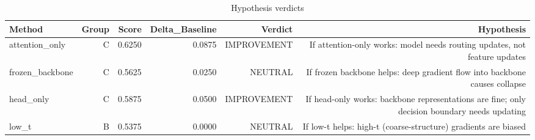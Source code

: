 \begin{table}[htbp]
\centering
\caption{Hypothesis verdicts}
\label{tab:hyp-verdicts}
\begin{tabular}{lrrrrr}
\toprule
\textbf{Method} & \textbf{Group} & \textbf{Score} & \textbf{Delta\_Baseline} & \textbf{Verdict} & \textbf{Hypothesis} \\
\midrule
attention\_only & C & 0.6250 & 0.0875 & IMPROVEMENT & If attention-only works: model needs routing updates, not feature updates \\
frozen\_backbone & C & 0.5625 & 0.0250 & NEUTRAL & If frozen backbone helps: deep gradient flow into backbone causes collapse \\
head\_only & C & 0.5875 & 0.0500 & IMPROVEMENT & If head-only works: backbone representations are fine; only decision boundary needs updating \\
low\_t & B & 0.5375 & 0.0000 & NEUTRAL & If low-t helps: high-t (coarse-structure) gradients are biased \\
\bottomrule
\end{tabular}
\end{table}